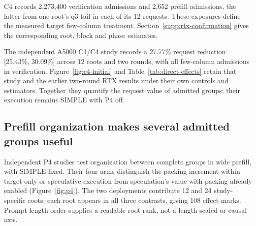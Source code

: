 C4 records 2,273,400 verification admissions and 2,652 prefill admissions, the latter from one root's q3 tail in each of its 12 requests. These exposures define the measured target few-column treatment. Section~\ref{supp:rtx-confirmation} gives the corresponding root, block and phase estimates.

The independent A5000 C1/C4 study records a 27.77\% request reduction [25.43\%, 30.09\%] across 12 roots and two rounds, with all few-column admissions in verification. Figure~\ref{fig:c4-initial} and Table~\ref{tab:direct-effects} retain that study and the earlier two-round RTX results under their own controls and estimators. Together they quantify the request value of admitted groups; their execution remains SIMPLE with P4 off.

\FloatBarrier
\subsection{Prefill organization makes several admitted groups useful}
\label{sec:p4}
Independent P4 studies test organization between complete groups in wide prefill, with SIMPLE fixed. Their four arms distinguish the packing increment within target-only or speculative execution from speculation's value with packing already enabled (Figure~\ref{fig:p4}). The two deployments contribute 12 and 24 study-specific roots; each root appears in all three contrasts, giving 108 effect marks. Prompt-length order supplies a readable root rank, not a length-scaled or causal axis.


